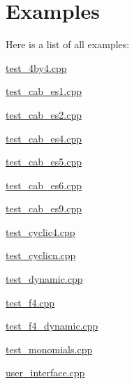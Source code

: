 \section{Examples}
Here is a list of all examples\+:\begin{DoxyCompactItemize}
\item 
\hyperlink{test_4by4_8cpp-example}{test\+\_\+4by4.\+cpp}
\item 
\hyperlink{test_cab_es1_8cpp-example}{test\+\_\+cab\+\_\+es1.\+cpp}
\item 
\hyperlink{test_cab_es2_8cpp-example}{test\+\_\+cab\+\_\+es2.\+cpp}
\item 
\hyperlink{test_cab_es4_8cpp-example}{test\+\_\+cab\+\_\+es4.\+cpp}
\item 
\hyperlink{test_cab_es5_8cpp-example}{test\+\_\+cab\+\_\+es5.\+cpp}
\item 
\hyperlink{test_cab_es6_8cpp-example}{test\+\_\+cab\+\_\+es6.\+cpp}
\item 
\hyperlink{test_cab_es9_8cpp-example}{test\+\_\+cab\+\_\+es9.\+cpp}
\item 
\hyperlink{test_cyclic4_8cpp-example}{test\+\_\+cyclic4.\+cpp}
\item 
\hyperlink{test_cyclicn_8cpp-example}{test\+\_\+cyclicn.\+cpp}
\item 
\hyperlink{test_dynamic_8cpp-example}{test\+\_\+dynamic.\+cpp}
\item 
\hyperlink{test_f4_8cpp-example}{test\+\_\+f4.\+cpp}
\item 
\hyperlink{test_f4_dynamic_8cpp-example}{test\+\_\+f4\+\_\+dynamic.\+cpp}
\item 
\hyperlink{test_monomials_8cpp-example}{test\+\_\+monomials.\+cpp}
\item 
\hyperlink{user_interface_8cpp-example}{user\+\_\+interface.\+cpp}
\end{DoxyCompactItemize}
